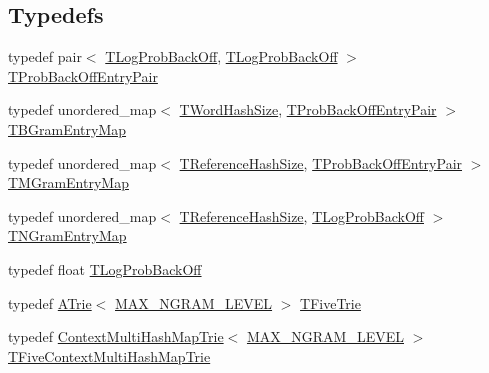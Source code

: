 \subsection*{Typedefs}
\begin{DoxyCompactItemize}
\item 
typedef pair$<$ \hyperlink{namespaceuva_1_1smt_1_1tries_acd0660255dd9ef5d644f01de49102750}{T\+Log\+Prob\+Back\+Off}, \hyperlink{namespaceuva_1_1smt_1_1tries_acd0660255dd9ef5d644f01de49102750}{T\+Log\+Prob\+Back\+Off} $>$ \hyperlink{namespaceuva_1_1smt_1_1tries_aeca18bf92dfc5ecf2028d93f9ba73981}{T\+Prob\+Back\+Off\+Entry\+Pair}
\item 
typedef unordered\+\_\+map$<$ \hyperlink{namespaceuva_1_1smt_1_1hashing_acdc1f2765e669283f8e9c1ed42705314}{T\+Word\+Hash\+Size}, \hyperlink{namespaceuva_1_1smt_1_1tries_aeca18bf92dfc5ecf2028d93f9ba73981}{T\+Prob\+Back\+Off\+Entry\+Pair} $>$ \hyperlink{namespaceuva_1_1smt_1_1tries_a320b838ead9f4f7ce1ca28f18acef6ec}{T\+B\+Gram\+Entry\+Map}
\item 
typedef unordered\+\_\+map$<$ \hyperlink{namespaceuva_1_1smt_1_1hashing_a6cc10b288b11b76c718a898b022fbdd1}{T\+Reference\+Hash\+Size}, \hyperlink{namespaceuva_1_1smt_1_1tries_aeca18bf92dfc5ecf2028d93f9ba73981}{T\+Prob\+Back\+Off\+Entry\+Pair} $>$ \hyperlink{namespaceuva_1_1smt_1_1tries_a21490f0bf060a75f3e963c580a64a3db}{T\+M\+Gram\+Entry\+Map}
\item 
typedef unordered\+\_\+map$<$ \hyperlink{namespaceuva_1_1smt_1_1hashing_a6cc10b288b11b76c718a898b022fbdd1}{T\+Reference\+Hash\+Size}, \hyperlink{namespaceuva_1_1smt_1_1tries_acd0660255dd9ef5d644f01de49102750}{T\+Log\+Prob\+Back\+Off} $>$ \hyperlink{namespaceuva_1_1smt_1_1tries_a994b61d58b0b25d288c1fb8a6a56a48a}{T\+N\+Gram\+Entry\+Map}
\item 
typedef float \hyperlink{namespaceuva_1_1smt_1_1tries_acd0660255dd9ef5d644f01de49102750}{T\+Log\+Prob\+Back\+Off}
\item 
typedef \hyperlink{classuva_1_1smt_1_1tries_1_1_a_trie}{A\+Trie}$<$ \hyperlink{namespaceuva_1_1smt_1_1tries_ad08b42e58134f38a6aa8af8591035ab9}{M\+A\+X\+\_\+\+N\+G\+R\+A\+M\+\_\+\+L\+E\+V\+E\+L} $>$ \hyperlink{namespaceuva_1_1smt_1_1tries_a55e7eb3ceb4e902809786973cf89aa9c}{T\+Five\+Trie}
\item 
typedef \hyperlink{classuva_1_1smt_1_1tries_1_1_context_multi_hash_map_trie}{Context\+Multi\+Hash\+Map\+Trie}$<$ \hyperlink{namespaceuva_1_1smt_1_1tries_ad08b42e58134f38a6aa8af8591035ab9}{M\+A\+X\+\_\+\+N\+G\+R\+A\+M\+\_\+\+L\+E\+V\+E\+L} $>$ \hyperlink{namespaceuva_1_1smt_1_1tries_a7ed391e3ba96f812885c5b45234b7a66}{T\+Five\+Context\+Multi\+Hash\+Map\+Trie}

\end{DoxyCompactItemize}

